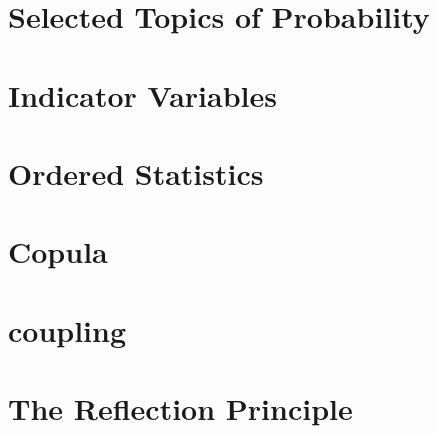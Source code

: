 \section{Selected Topics of Probability}
\section{Indicator Variables}
\section{Ordered Statistics}
\section{Copula}
\section{coupling}
\section{The Reflection Principle}
